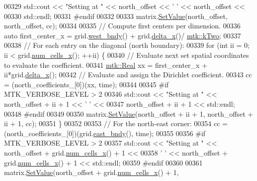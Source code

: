 \begin{DoxyCode}
00329   std::cout << \textcolor{stringliteral}{"Setting at "} << north\_offset << \textcolor{charliteral}{' '} << north\_offset <<
00330     std::endl;
00331 \textcolor{preprocessor}{  #endif}
00332 
00333   matrix.\hyperlink{classmtk_1_1DenseMatrix_a784ce5784109ac86bfb9d8562b334b13}{SetValue}(north\_offset, north\_offset, cc);
00334 
00335   \textcolor{comment}{// Compute first centers per dimension.}
00336   \textcolor{keyword}{auto} first\_center\_x = grid.\hyperlink{classmtk_1_1UniStgGrid2D_af2b1712387ded85edaf2b64617d3fc13}{west\_bndy}() + grid.\hyperlink{classmtk_1_1UniStgGrid2D_aca4710004c4a7da6a9e8fd6ab32a691f}{delta\_x}()/
      \hyperlink{group__c01-roots_gaf39c2d851a2db744f4feb1c5ab3ec2cf}{mtk::kTwo};
00337 
00338   \textcolor{comment}{// For each entry on the diagonal (north boundary):}
00339   \textcolor{keywordflow}{for} (\textcolor{keywordtype}{int} ii = 0; ii < grid.\hyperlink{classmtk_1_1UniStgGrid2D_a2d182866a398aba8e4829590e85bf939}{num\_cells\_x}(); ++ii) \{
00340     \textcolor{comment}{// Evaluate next set spatial coordinates to evaluate the coefficient.}
00341     \hyperlink{group__c01-roots_gac080bbbf5cbb5502c9f00405f894857d}{mtk::Real} xx = first\_center\_x + ii*grid.\hyperlink{classmtk_1_1UniStgGrid2D_aca4710004c4a7da6a9e8fd6ab32a691f}{delta\_x}();
00342     \textcolor{comment}{// Evaluate and assign the Dirichlet coefficient.}
00343     cc = (north\_coefficients\_[0])(xx, time);
00344 
00345 \textcolor{preprocessor}{    #if MTK\_VERBOSE\_LEVEL > 2}
00346     std::cout << \textcolor{stringliteral}{"Setting at "} << north\_offset + ii + 1 << \textcolor{charliteral}{' '} <<
00347       north\_offset + ii + 1 << std::endl;
00348 \textcolor{preprocessor}{    #endif}
00349 
00350     matrix.\hyperlink{classmtk_1_1DenseMatrix_a784ce5784109ac86bfb9d8562b334b13}{SetValue}(north\_offset + ii + 1, north\_offset + ii + 1, cc);
00351   \}
00352 
00353   \textcolor{comment}{// For the north-east corner:}
00354   cc = (north\_coefficients\_[0])(grid.\hyperlink{classmtk_1_1UniStgGrid2D_a03f689eb29a6369b82ce1207c655d5ff}{east\_bndy}(), time);
00355 
00356 \textcolor{preprocessor}{  #if MTK\_VERBOSE\_LEVEL > 2}
00357   std::cout << \textcolor{stringliteral}{"Setting at "} << north\_offset + grid.\hyperlink{classmtk_1_1UniStgGrid2D_a2d182866a398aba8e4829590e85bf939}{num\_cells\_x}() + 1 <<
00358     \textcolor{charliteral}{' '} << north\_offset + grid.\hyperlink{classmtk_1_1UniStgGrid2D_a2d182866a398aba8e4829590e85bf939}{num\_cells\_x}() + 1 << std::endl;
00359 \textcolor{preprocessor}{  #endif}
00360 
00361   matrix.\hyperlink{classmtk_1_1DenseMatrix_a784ce5784109ac86bfb9d8562b334b13}{SetValue}(north\_offset + grid.\hyperlink{classmtk_1_1UniStgGrid2D_a2d182866a398aba8e4829590e85bf939}{num\_cells\_x}() + 1,

\end{DoxyCode}
